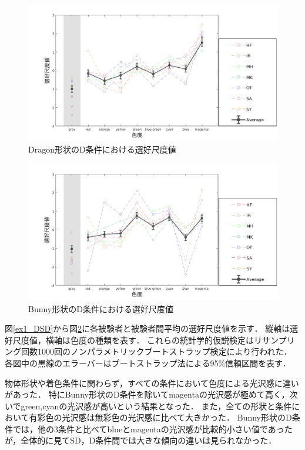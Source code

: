             \newpage
            \begin{figure}[h]
                \centering
                \includegraphics[width=15.0cm]{./img/ex1_res_DD_p.png}
                \caption{Dragon形状のD条件における選好尺度値}
                \label{ex1_DD}
            \end{figure}

            \begin{figure}[h]
                \centering
                \includegraphics[width=15.0cm]{./img/ex1_res_BD_p.png}
                \caption{Bunny形状のD条件における選好尺度値}
                \label{ex1_BD}
            \end{figure}

            図\ref{ex1_DSD}から図\ref{ex1_BD}に各被験者と被験者間平均の選好尺度値を示す．
            縦軸は選好尺度値，横軸は色度の種類を表す．
            これらの統計学的仮説検定はリサンプリング回数1000回のノンパラメトリックブートストラップ検定により行われた．
            各図中の黒線のエラーバーはブートストラップ法による95\%信頼区間を表す．

            物体形状や着色条件に関わらず，すべての条件において色度による光沢感に違いがあった．
            特にBunny形状のD条件を除いてmagentaの光沢感が極めて高く，次いでgreen,cyanの光沢感が高いという結果となった．
            また，全ての形状と条件において有彩色の光沢感は無彩色の光沢感に比べて大きかった．
            Bunny形状のD条件では，他の3条件と比べてblueとmagentaの光沢感が比較的小さい値であったが，全体的に見てSD，D条件間では大きな傾向の違いは見られなかった．

